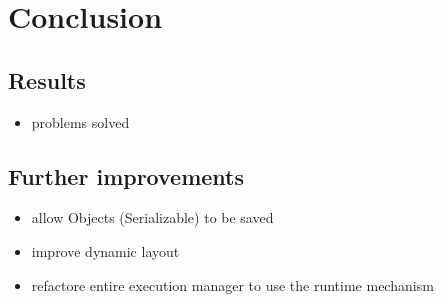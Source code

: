 \chapter{Conclusion}
\label{chapter:Conclusion}
\section{Results}
\begin{itemize}
 \item problems solved
\end{itemize}

\section{Further improvements}
\begin{itemize}
 \item allow Objects (Serializable) to be saved
 \item improve dynamic layout
 \item refactore entire execution manager to use the runtime mechanism
\end{itemize}